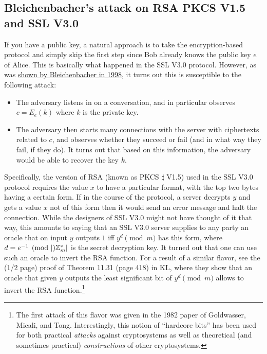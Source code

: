 \subsection{Bleichenbacher's attack on RSA PKCS V1.5 and SSL
V3.0}\label{Bleichenbachers-attack-on}

If you have a public key, a natural approach is to take the
encryption-based protocol and simply skip the first step since Bob
already knows the public key \(e\) of Alice. This is basically what
happened in the SSL V3.0 protocol. However, as was
\href{http://archiv.infsec.ethz.ch/education/fs08/secsem/bleichenbacher98.pdf}{shown
by Bleichenbacher in 1998}, it turns out this is susceptible to the
following attack:

\begin{itemize}
\item
  The adversary listens in on a conversation, and in particular observes
  \(c=E_e(k)\) where \(k\) is the private key.
\item
  The adversary then starts many connections with the server with
  ciphertexts related to \(c\), and observes whether they succeed or
  fail (and in what way they fail, if they do). It turns out that based
  on this information, the adversary would be able to recover the key
  \(k\).
\end{itemize}

Specifically, the version of RSA (known as PKCS \(\sharp\) V1.5) used in
the SSL V3.0 protocol requires the value \(x\) to have a particular
format, with the top two bytes having a certain form. If in the course
of the protocol, a server decrypts \(y\) and gets a value \(x\) not of
this form then it would send an error message and halt the connection.
While the designers of SSL V3.0 might not have thought of it that way,
this amounts to saying that an SSL V3.0 server supplies to any party an
oracle that on input \(y\) outputs \(1\) iff \(y^{d} \pmod{m}\) has this
form, where \(d = e^{-1} \pmod|{\mathbb{Z}}^*_m|\) is the secret decryption key.
It turned out that one can use such an oracle to invert the RSA
function. For a result of a similar flavor, see the (1/2 page) proof of
Theorem 11.31 (page 418) in KL, where they show that an oracle that
given \(y\) outputs the least significant bit of \(y^d \pmod{m}\) allows
to invert the RSA function.\footnote{The first attack of this flavor was
  given in the 1982 paper of Goldwasser, Micali, and Tong.
  Interestingly, this notion of ``hardcore bits'' has been used for both
  practical \emph{attacks} against cryptosystems as well as theoretical
  (and sometimes practical) \emph{constructions} of other cryptosystems.}

